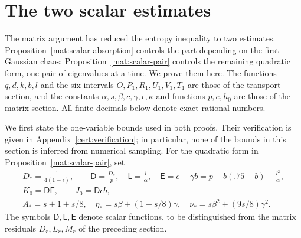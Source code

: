 \section{The two scalar estimates}\label{sc:scalar}\label{sc:section}

The matrix argument has reduced the entropy inequality to two estimates.
Proposition~\ref{mat:scalar-absorption} controls the part depending on the
first Gaussian chaos; Proposition~\ref{mat:scalar-pair} controls the remaining
quadratic form, one pair of eigenvalues at a time.  We prove them here.
The functions $q,d,k,b,l$ and the six intervals
$O,P_1,R_1,U_1,V_1,T_1$ are those of the transport section, and the constants
$\alpha,s,\beta,c,\gamma,\epsilon,\kappa$ and functions $p,e,h_0$ are those
of the matrix section.  All finite decimals below denote exact rational
numbers.

We first state the one-variable bounds used in both proofs.  Their verification
is given in Appendix~\ref{cert:verification}; in particular, none of the
bounds in this section is inferred from numerical sampling.  For the
quadratic form in Proposition~\ref{mat:scalar-pair}, set
\begin{equation}\label{sc:auxiliary-functions}
 \begin{gathered}
 D_*=\frac{1}{4(1-\epsilon)},\qquad
 \mathsf D=\frac{D_*}{p},\quad \mathsf L=\frac{l}{\alpha},\quad
 \mathsf E=e+\gamma b
       =p+b(.75-b)-\frac{l^2}{\alpha},\\
 K_0=\mathsf D\mathsf E,\qquad J_0=\mathsf D cb,\\
 A_*=s+1+s/8,\quad
 \eta_*=s\beta+(1+s/8)\gamma,\quad
 \nu_*=s\beta^2+(9s/8)\gamma^2.
 \end{gathered}
\end{equation}
The symbols $\mathsf D,\mathsf L,\mathsf E$ denote scalar functions, to
be distinguished from the matrix residuals $D_r,L_r,M_r$ of the preceding
section.

